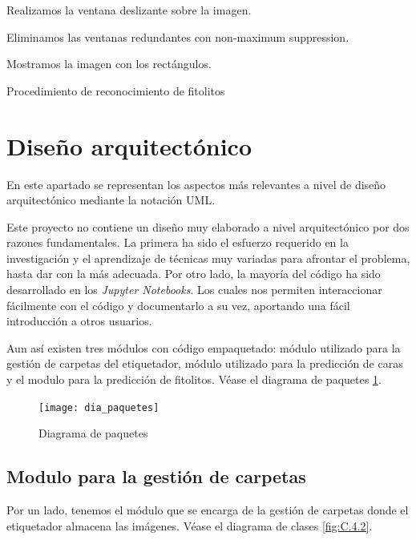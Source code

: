 \begin{algorithm}
    Realizamos la ventana deslizante sobre la imagen.    
    
    
    Eliminamos las ventanas redundantes con non-maximum suppression.

    Mostramos la imagen con los rectángulos.
    \caption{Procedimiento de reconocimiento de fitolitos}
    \label{alg:3}
\end{algorithm}

\section{Diseño arquitectónico}

En este apartado se representan los aspectos más relevantes a nivel de diseño arquitectónico mediante la notación UML.

Este proyecto no contiene un diseño muy elaborado a nivel arquitectónico por dos razones fundamentales. La primera ha sido el esfuerzo requerido en la investigación y el aprendizaje de técnicas muy variadas para afrontar el problema, hasta dar con la más adecuada. Por otro lado, la mayoría del código ha sido desarrollado en los \textit{Jupyter Notebooks}. Los cuales nos permiten interaccionar fácilmente con el código y documentarlo a su vez, aportando una fácil introducción a otros usuarios.

Aun así existen tres módulos con código empaquetado: módulo utilizado para la gestión de carpetas del etiquetador, módulo utilizado para la predicción de caras y el modulo para la predicción de fitolitos. Véase el diagrama de paquetes \ref{fig:C.4.1}.

\begin{figure}
\centering
\texttt{[image: dia\_paquetes]}
\caption{Diagrama de paquetes}
\label{fig:C.4.1}
\end{figure}

\subsection{Modulo para la gestión de carpetas}

Por un lado, tenemos el módulo que se encarga de la gestión de carpetas donde el etiquetador almacena las imágenes. Véase el diagrama de clases \ref{fig:C.4.2}.

